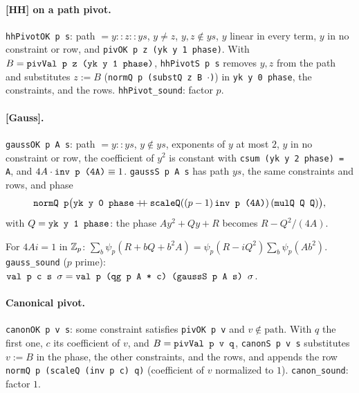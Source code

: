 \paragraph{[HH] on a path pivot.} \textnormal{\texttt{hhPivotOK p s}}: path $= y::z::ys$, $y\ne z$, $y,z\notin ys$,
$y$ linear in every term, $y$ in no constraint or row, and \textnormal{\texttt{pivOK p z (\allowbreak{}yk y 1 phase)}}. With
$B = \textnormal{\texttt{pivVal p z (\allowbreak{}yk y 1 phase)}}$, \textnormal{\texttt{hhPivotS p s}} removes $y,z$ from the path and
substitutes $z:=B$ (\textnormal{\texttt{normQ p (\allowbreak{}substQ z B \ensuremath{\cdot})}}) in \textnormal{\texttt{yk y 0 phase}}, the constraints, and the
rows. \textnormal{\texttt{hhPivot\_\allowbreak{}sound}}: factor $p$.

\paragraph{[Gauss].} \textnormal{\texttt{gaussOK p A s}}: path $=y::ys$, $y\notin ys$, exponents of $y$ at most
$2$, $y$ in no constraint or row, the coefficient of $y^2$ is constant with
\textnormal{\texttt{csum (\allowbreak{}yk y 2 phase) = A}}, and $4A\cdot\textnormal{\texttt{inv p (\allowbreak{}4A)}}\equiv1$.
\textnormal{\texttt{gaussS p A s}} has path $ys$, the same constraints and rows, and phase
\[
\textnormal{\texttt{normQ p}}\bigl(\textnormal{\texttt{yk y 0 phase}} \mathbin{+\!\!+}\textnormal{\texttt{scaleQ}}((p-1)\,\textnormal{\texttt{inv p (\allowbreak{}4A)}})\,(\textnormal{\texttt{mulQ Q Q}})\bigr),
\]
with $Q = \textnormal{\texttt{yk y 1 phase}}$: the phase $Ay^2+Qy+R$ becomes $R-Q^2/(4A)$.
\begin{theorem}
For $4Ai=1$ in $\mathbb{Z}_{p}$: $\sum_b\psi_p(R+bQ+b^2A) = \psi_p(R-iQ^2)\sum_b\psi_p(Ab^2)$.
\textnormal{\texttt{gauss\_\allowbreak{}sound}} ($p$ prime): $\textnormal{\texttt{val p c s \ensuremath{\sigma}}} = \textnormal{\texttt{val p (\allowbreak{}qg p A * c) (\allowbreak{}gaussS p A s) \ensuremath{\sigma}}}$.
\end{theorem}

\paragraph{Canonical pivot.} \textnormal{\texttt{canonOK p v s}}: some constraint satisfies \textnormal{\texttt{pivOK p v}} and
$v\notin\text{path}$. With $q$ the first one, $c$ its coefficient of $v$, and $B = \textnormal{\texttt{pivVal p v q}}$,
\textnormal{\texttt{canonS p v s}} substitutes $v:=B$ in the phase, the other constraints, and the rows, and
appends the row \textnormal{\texttt{normQ p (\allowbreak{}scaleQ (\allowbreak{}inv p c) q)}} (coefficient of $v$ normalized to $1$).
\textnormal{\texttt{canon\_\allowbreak{}sound}}: factor $1$.

